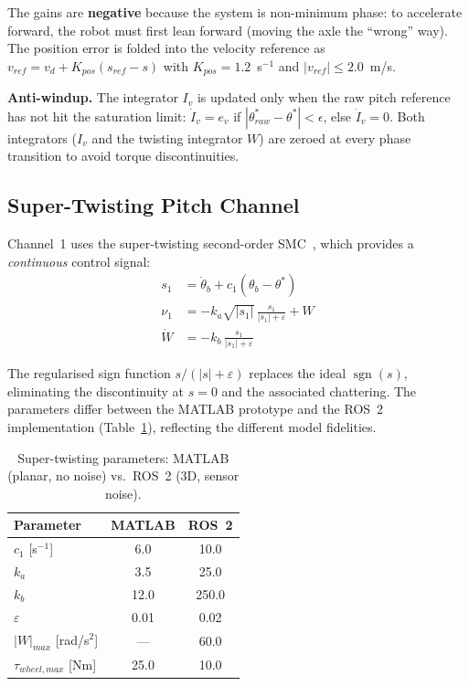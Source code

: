 \documentclass[11pt,a4paper]{article}
\begin{document}
The gains are \textbf{negative} because the system is non-minimum phase: to accelerate
forward, the robot must first lean forward (moving the axle the ``wrong'' way).  The
position error is folded into the velocity reference as
$v_{ref} = v_d + K_{pos}(s_{ref} - s)$ with $K_{pos} = 1.2$~s$^{-1}$ and
$|v_{ref}| \leq 2.0$~m/s.

\textbf{Anti-windup.}  The integrator $I_v$ is updated only when the raw pitch reference
has not hit the saturation limit: $\dot{I}_v = e_v$ if $|\theta_{raw}^* - \theta^*| <
\epsilon$, else $\dot{I}_v = 0$.  Both integrators ($I_v$ and the twisting integrator $W$)
are zeroed at every phase transition to avoid torque discontinuities.

\subsection{Super-Twisting Pitch Channel}

Channel~1 uses the super-twisting second-order SMC~\cite{levant1993, moreno2012}, which
provides a \emph{continuous} control signal:
\begin{align}
    s_1 &= \dot{\theta}_b + c_1(\theta_b - \theta^*) \\[4pt]
    \nu_1 &= -k_a\sqrt{|s_1|}\,\frac{s_1}{|s_1|+\varepsilon} + W \\[4pt]
    \dot{W} &= -k_b\,\frac{s_1}{|s_1|+\varepsilon}
\end{align}

The regularised sign function $s/(|s|+\varepsilon)$ replaces the ideal
$\operatorname{sgn}(s)$, eliminating the discontinuity at $s=0$ and the associated
chattering.  The parameters differ between the MATLAB prototype and the ROS~2
implementation (Table~\ref{tab:smc_params}), reflecting the different model fidelities.

\begin{table}[H]
    \centering
    \caption{Super-twisting parameters: MATLAB (planar, no noise) vs.\ ROS~2
    (3D, sensor noise).}
    \label{tab:smc_params}
    \begin{tabular}{lcc}
        \toprule
        Parameter & MATLAB & ROS~2 \\
        \midrule
        $c_1$ [s$^{-1}$] & 6.0 & 10.0 \\
        $k_a$ & 3.5 & 25.0 \\
        $k_b$ & 12.0 & 250.0 \\
        $\varepsilon$ & 0.01 & 0.02 \\
        $|W|_{max}$ [rad/s$^2$] & --- & 60.0 \\
        $\tau_{wheel,max}$ [Nm] & 25.0 & 10.0 \\
        \bottomrule
    \end{tabular}
\end{table}
\end{document}
